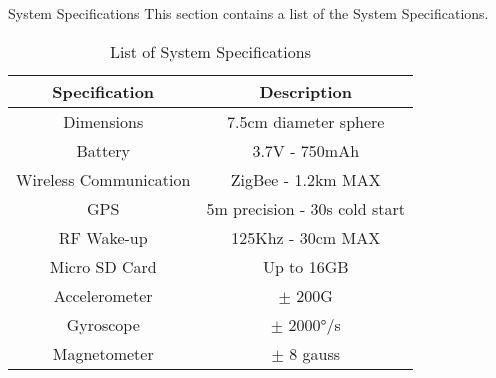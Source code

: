 \begin{customAppendixPage}{System Specifications}
This section contains a list of the System Specifications.
\end{customAppendixPage}
\renewcommand*{\thepage}{\thesection-\arabic{page}}

\begin{table}
\caption{List of System Specifications \label{tab:systemSpecs}}
\centering
    \begin{tabular}{|c|c|}
    \hline
    \rowcolor{Gray} Specification          & Description                   \\ \hline \hline 
    Dimensions             & 7.5cm diameter sphere          \\
    Battery                & 3.7V - 750mAh                 \\
    Wireless Communication & ZigBee - 1.2km MAX            \\
    GPS                    & 5m precision - 30s cold start \\
    RF Wake-up             & 125Khz - 30cm MAX             \\
    Micro SD Card          & Up to 16GB                    \\
    Accelerometer          & $\pm$ 200G                      \\
    Gyroscope              & $\pm$ 2000°/s                   \\
    Magnetometer           & $\pm$ 8 gauss                    \\
	\hline
    \end{tabular}
\end{table}